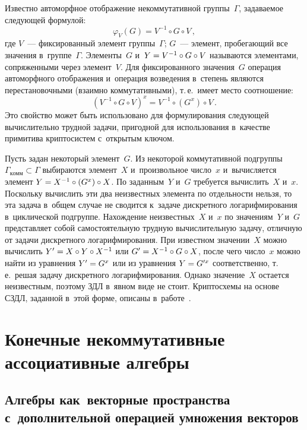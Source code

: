 \begin{multicols}{2}
  Известно автоморфное отображение некоммутативной группы~$\Gamma$, 
задаваемое следующей формулой:
  $$
  \varphi_V(G) =V^{-1}\circ G\circ V\,,
  $$
  где $V$~--- фиксированный элемент группы~$\Gamma$; $G$~--- элемент, 
пробегающий все значения в~группе~$\Gamma$. Элементы~$G$ и~$Y\hm=V^{-
1}\circ G\circ V$ называются элементами, сопряженными через элемент~$V$. 
Для фиксированного значения~$G$ операция автоморфного отоб\-ра\-же\-ния 
и~операция возведения в~степень являются перестановочными (взаимно 
коммутативными), т.\,е.\ имеет место соотношение: 
  $$
  \left( V^{-1}\circ G\circ V\right)^x=V^{-1}\circ (G^x)\circ V\,.
  $$
  Это свойство может быть использовано для формулирования следующей 
вычислительно трудной задачи, пригодной для использования в~качестве 
примитива криптосистем с~открытым ключом. 
  
  Пусть задан некоторый элемент~$G$. Из некоторой коммутативной 
подгруппы~$\Gamma_{\mathrm{комм}}\subset \Gamma$ вы\-бираются элемент~$X$ 
и~произвольное число~$x$ и~вы\-чис\-ля\-ет\-ся элемент $Y\hm=X^{-1}\circ (G^x)\circ 
X$. По \mbox{заданным}~$Y$ и~$G$ требуется вычислить~$X$ и~$x$. Поскольку 
вычислить эти два неизвестных элемента по отдельности нельзя, то эта задача 
в~общем случае не сводится к~задаче дискретного логарифмирования 
в~циклической подгруппе. Нахождение неизвестных~$X$ и~$x$ по 
значениям~$Y$ и~$G$ представляет собой самостоятельную трудную 
вычислительную задачу, отличную от задачи дискретного логарифмирования. 
При известном значении~$X$ можно вычислить $Y^\prime \hm=X\circ Y\circ 
X^{-1}$ или $G^\prime\hm=X^{-1} \circ G\circ X$, после чего число~$x$ можно 
найти из уравнения $Y^\prime\hm=G^x$ или из уравнения  $Y\hm=G^{\prime x}$ 
соответственно, т.\,е.\ решая задачу дискретного логарифмирования. Однако 
значение~$X$ остается неизвестным, поэтому ЗДЛ в~явном виде не стоит. 
Криптосхемы на основе СЗДЛ, заданной в~этой форме, описаны 
в~работе~\cite{4-f}.
  
\section{Конечные некоммутативные ассоциативные алгебры}

  \subsection{Алгебры как~векторные пространства с~дополнительной 
операцией умножения векторов}
  

\end{multicols}
